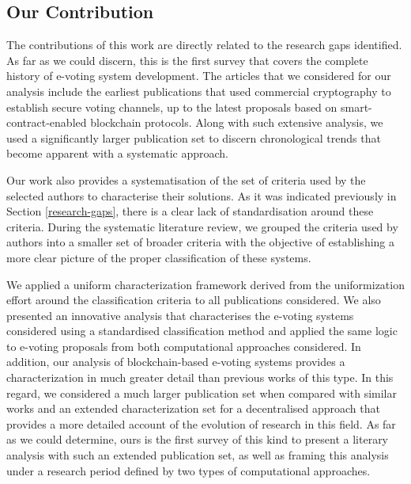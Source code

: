 \documentclass{ieeeaccess}
\begin{document}
    \subsection{Our Contribution}
    The contributions of this work are directly related to the research gaps identified. As far as we could discern, this is the first survey that covers the complete history of e-voting system development. The articles that we considered for our analysis include the earliest publications that used commercial cryptography to establish secure voting channels, up to the latest proposals based on smart-contract-enabled blockchain protocols. Along with such extensive analysis, we used a significantly larger publication set to discern chronological trends that become apparent with a systematic approach.
    \par
    Our work also provides a systematisation of the set of criteria used by the selected authors to characterise their solutions. As it was indicated previously in Section \ref{research-gaps}, there is a clear lack of standardisation around these criteria. During the systematic literature review, we grouped the criteria used by authors into a smaller set of broader criteria with the objective of establishing a more clear picture of the proper classification of these systems.
    \par
    We applied a uniform characterization framework derived from the uniformization effort around the classification criteria to all publications considered. We also presented an innovative analysis that characterises the e-voting systems considered using a standardised classification method and applied the same logic to e-voting proposals from both computational approaches considered. In addition, our analysis of blockchain-based e-voting systems provides a characterization in much greater detail than previous works of this type. In this regard, we considered a much larger publication set when compared with similar works and an extended characterization set for a decentralised approach that provides a more detailed account of the evolution of research in this field. As far as we could determine, ours is the first survey of this kind to present a literary analysis with such an extended publication set, as well as framing this analysis under a research period defined by two types of computational approaches.
\end{document}
